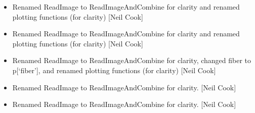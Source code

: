 \documentclass[a4paper,10pt,english]{report}
\begin{document}
\begin{itemize}
\item {} 
Renamed ReadImage to ReadImageAndCombine for clarity and renamed
plotting functions (for clarity) {[}Neil Cook{]}

\item {} 
Renamed ReadImage to ReadImageAndCombine for clarity and renamed
plotting functions (for clarity) {[}Neil Cook{]}

\item {} 
Renamed ReadImage to ReadImageAndCombine for clarity, changed fiber to
p{[}‘fiber’{]}, and renamed plotting functions (for clarity) {[}Neil Cook{]}

\item {} 
Renamed ReadImage to ReadImageAndCombine for clarity. {[}Neil Cook{]}

\item {} 
Renamed ReadImage to ReadImageAndCombine for clarity. {[}Neil Cook{]}

\end{itemize}
\end{document}
